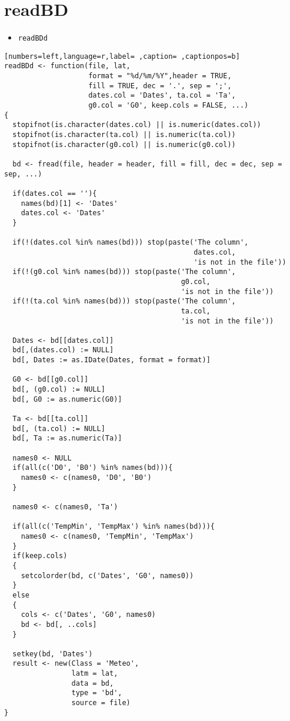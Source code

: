 \section{readBD}
\label{sec:orgeb1f9ef}
\begin{itemize}
\item \texttt{readBDd}
\end{itemize}
\begin{lstlisting}[numbers=left,language=r,label= ,caption= ,captionpos=b]
readBDd <- function(file, lat,
                    format = "%d/%m/%Y",header = TRUE,
                    fill = TRUE, dec = '.', sep = ';',
                    dates.col = 'Dates', ta.col = 'Ta',
                    g0.col = 'G0', keep.cols = FALSE, ...)
{
  stopifnot(is.character(dates.col) || is.numeric(dates.col))
  stopifnot(is.character(ta.col) || is.numeric(ta.col))
  stopifnot(is.character(g0.col) || is.numeric(g0.col))

  bd <- fread(file, header = header, fill = fill, dec = dec, sep = sep, ...)

  if(dates.col == ''){
    names(bd)[1] <- 'Dates'
    dates.col <- 'Dates'
  }
  
  if(!(dates.col %in% names(bd))) stop(paste('The column',
                                             dates.col,
                                             'is not in the file'))
  if(!(g0.col %in% names(bd))) stop(paste('The column',
                                          g0.col,
                                          'is not in the file'))
  if(!(ta.col %in% names(bd))) stop(paste('The column',
                                          ta.col,
                                          'is not in the file'))
  
  Dates <- bd[[dates.col]]
  bd[,(dates.col) := NULL]
  bd[, Dates := as.IDate(Dates, format = format)]

  G0 <- bd[[g0.col]]
  bd[, (g0.col) := NULL]
  bd[, G0 := as.numeric(G0)]
  
  Ta <- bd[[ta.col]]
  bd[, (ta.col) := NULL]
  bd[, Ta := as.numeric(Ta)]

  names0 <- NULL
  if(all(c('D0', 'B0') %in% names(bd))){
    names0 <- c(names0, 'D0', 'B0')
  }

  names0 <- c(names0, 'Ta')

  if(all(c('TempMin', 'TempMax') %in% names(bd))){
    names0 <- c(names0, 'TempMin', 'TempMax')
  }
  if(keep.cols)
  {
    setcolorder(bd, c('Dates', 'G0', names0))
  }
  else
  {
    cols <- c('Dates', 'G0', names0)
    bd <- bd[, ..cols]
  }

  setkey(bd, 'Dates')
  result <- new(Class = 'Meteo',
                latm = lat,
                data = bd,
                type = 'bd',
                source = file)
}
\end{lstlisting}
